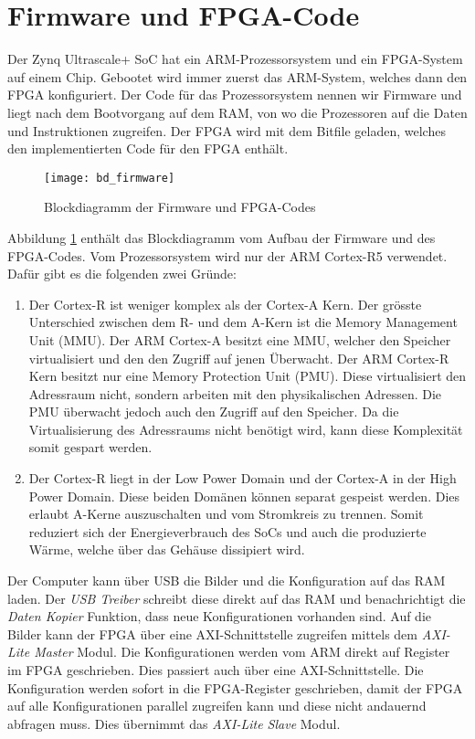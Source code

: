 \section{Firmware und FPGA-Code}

Der Zynq Ultrascale+ SoC hat ein ARM-Prozessorsystem und ein FPGA-System auf einem Chip. Gebootet wird immer zuerst das ARM-System, welches dann den FPGA konfiguriert. Der Code für das Prozessorsystem nennen wir Firmware und liegt nach dem Bootvorgang auf dem RAM, von wo die Prozessoren auf die Daten und Instruktionen zugreifen. Der FPGA wird mit dem Bitfile geladen, welches den implementierten Code für den FPGA enthält. 

\begin{figure}[tb]
    \centering
    \texttt{[image: bd\_firmware]}
    \caption{Blockdiagramm der Firmware und FPGA-Codes}
    \label{fig:bd_firmware}
\end{figure}

Abbildung \ref{fig:bd_firmware} enthält das Blockdiagramm vom Aufbau der Firmware und des FPGA-Codes. Vom Prozessorsystem wird nur der ARM Cortex-R5 verwendet. Dafür gibt es die folgenden zwei Gründe:

\begin{enumerate}
    \item Der Cortex-R ist weniger komplex als der Cortex-A Kern. Der grösste Unterschied zwischen dem R- und dem A-Kern ist die Memory Management Unit (MMU). Der ARM Cortex-A besitzt eine MMU, welcher den Speicher virtualisiert und den den Zugriff auf jenen Überwacht. Der ARM Cortex-R Kern besitzt nur eine Memory Protection Unit (PMU). Diese virtualisiert den Adressraum nicht, sondern arbeiten mit den physikalischen Adressen. Die PMU überwacht jedoch auch den Zugriff auf den Speicher. Da die Virtualisierung des Adressraums nicht benötigt wird, kann diese Komplexität somit gespart werden. 
    \item Der Cortex-R liegt in der Low Power Domain und der Cortex-A in der High Power Domain. Diese beiden Domänen können separat gespeist werden. Dies erlaubt A-Kerne auszuschalten und vom Stromkreis zu trennen. Somit reduziert sich der Energieverbrauch des SoCs und auch die produzierte Wärme, welche über das Gehäuse dis­si­pie­rt wird.
\end{enumerate}

Der Computer kann über USB die Bilder und die Konfiguration auf das RAM laden. Der \textit{USB Treiber} schreibt diese direkt auf das RAM und benachrichtigt die \textit{Daten Kopier} Funktion, dass neue Konfigurationen vorhanden sind. Auf die Bilder kann der FPGA über eine AXI-Schnittstelle zugreifen mittels dem \textit{AXI-Lite Master} Modul. Die Konfigurationen werden vom ARM direkt auf Register im FPGA geschrieben. Dies passiert auch über eine AXI-Schnittstelle. Die Konfiguration werden sofort in die FPGA-Register geschrieben, damit der FPGA auf alle Konfigurationen parallel zugreifen kann und diese nicht andauernd abfragen muss. Dies übernimmt das \textit{AXI-Lite Slave} Modul.


